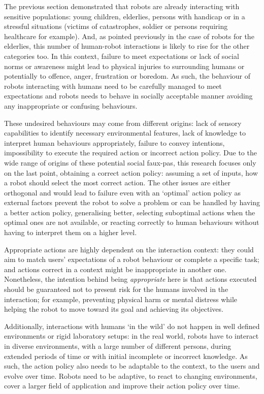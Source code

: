     The previous section demonstrated that robots are already interacting with sensitive populations: young children, elderlies, persons with handicap or in a stressful situations (victims of catastrophes, soldier or persons requiring healthcare for example). And, as pointed previously in the case of robots for the elderlies, this number of human-robot interactions is likely to rise for the other categories too. In this context, failure to meet expectations or lack of social norms or awareness might lead to physical injuries to surrounding humans or potentially to offence, anger, frustration or boredom. As such, the behaviour of robots interacting with humans need to be carefully managed to meet expectations and robots needs to behave in socially acceptable manner avoiding any inappropriate or confusing behaviours.
    
    These undesired behaviours may come from different origins: lack of sensory capabilities to identify necessary environmental features, lack of knowledge to interpret human behaviours appropriately, failure to convey intentions, impossibility to execute the required action or incorrect action policy. Due to the wide range of origins of these potential social faux-pas, this research focuses only on the last point, obtaining a correct action policy: assuming a set of inputs, how a robot should select the most correct action. The other issues are either orthogonal and would lead to failure even with an `optimal' action policy as external factors prevent the robot to solve a problem or can be handled by having a better action policy, generalising better, selecting suboptimal actions when the optimal ones are not available, or reacting correctly to human behaviours without having to interpret them on a higher level. 
    
    Appropriate actions are highly dependent on the interaction context: they could aim to match users' expectations of a robot behaviour or complete a specific task; and actions correct in a context might be inappropriate in another one. Nonetheless, the intention behind being \textit{appropriate} here is that actions executed should be guaranteed not to present risk for the humans involved in the interaction; for example, preventing physical harm or mental distress while helping the robot to move toward its goal and achieving its objectives.

    Additionally, interactions with humans `in the wild' \citep{belpaeme2012multimodal} do not happen in well defined environments or rigid laboratory setups: in the real world, robots have to interact in diverse environments, with a large number of different persons, during extended periods of time or with initial incomplete or incorrect knowledge. As such, the action policy also needs to be adaptable to the context, to the users and evolve over time. Robots need to be adaptive, to react to changing environments, cover a larger field of application and improve their action policy over time.

